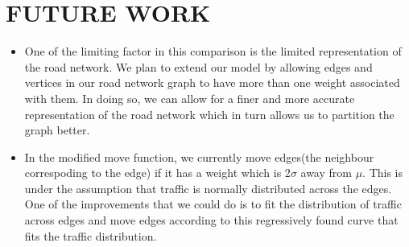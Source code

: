 \section{FUTURE WORK}
\label{sec:futu}

\begin{itemize}
\item One of the limiting factor in this comparison is the limited representation of the road network. We plan to extend our model by allowing edges and vertices in our road network graph to have more than one weight associated with them. In doing so, we can allow for a finer and more accurate representation of the road network which in turn allows us to partition the graph better.
\item In the modified move function, we currently move edges(the neighbour correspoding to the edge) if it has a weight which is 2$\sigma$ away from $\mu$. This is under the assumption that traffic is normally distributed across the edges. One of the improvements that we could do is to fit the distribution of traffic across edges and move edges according to this regressively found curve that fits the traffic distribution.
\end{itemize}